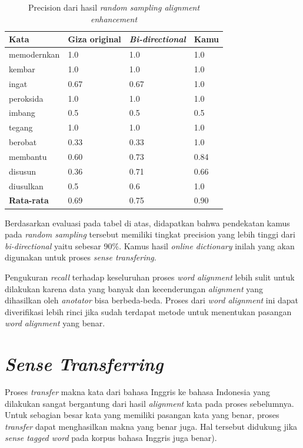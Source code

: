 \begin{table}
	\centering
	\caption{Precision dari hasil \textit{random sampling alignment enhancement}}
	\label{table:enhancement-precision}
	\begin{tabular}{|p{2.5cm}|p{3cm}|p{3cm}|p{3cm}|}
		\hline
		\textbf{Kata} & \textbf{Giza original} & \textbf{\textit{Bi-directional}} & \textbf{Kamu}
		\\ \hline
		memodernkan & 1.0 & 1.0 & 1.0 \\ \hline
		kembar & 1.0 & 1.0 & 1.0 \\ \hline
		ingat & 0.67 & 0.67 & 1.0 \\ \hline
		peroksida & 1.0 & 1.0 & 1.0 \\ \hline
		imbang & 0.5 & 0.5 & 0.5 \\ \hline
		tegang & 1.0  & 1.0 & 1.0 \\ \hline
		berobat & 0.33  & 0.33 & 1.0 \\ \hline
		membantu & 0.60 & 0.73 & 0.84 \\ \hline
		disusun & 0.36  & 0.71 & 0.66 \\ \hline
		diusulkan & 0.5 & 0.6 & 1.0 \\ \hline	
		\hline
		\textbf{Rata-rata} & 0.69 & 0.75 & 0.90 \\ \hline
	\end{tabular}
\end{table}

Berdasarkan evaluasi pada tabel di atas, didapatkan bahwa pendekatan kamus pada \textit{random sampling} tersebut memiliki tingkat precision yang lebih tinggi dari \textit{bi-directional} yaitu sebesar 90\%. Kamus hasil \textit{online dictionary} inilah yang akan digunakan untuk proses \textit{sense transfering}.

Pengukuran \textit{recall} terhadap keseluruhan proses \textit{word alignment} lebih sulit untuk dilakukan karena data yang banyak dan kecenderungan \textit{alignment} yang dihasilkan oleh \textit{anotator} bisa berbeda-beda. Proses dari \textit{word alignment} ini dapat diverifikasi lebih rinci jika sudah terdapat metode untuk menentukan pasangan \textit{word alignment} yang benar.

\section{\textit{Sense Transferring}}

Proses \textit{transfer} makna kata dari bahasa Inggris ke bahasa Indonesia yang dilakukan sangat bergantung dari hasil \textit{alignment} kata pada proses sebelumnya. Untuk sebagian besar kata yang memiliki pasangan kata yang benar, proses \textit{transfer} dapat menghasilkan makna yang benar juga. Hal tersebut didukung jika \textit{sense tagged word} pada korpus bahasa Inggris juga benar).

